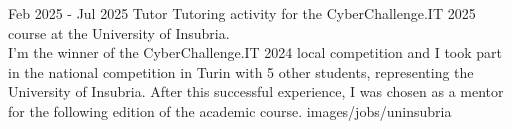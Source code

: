 {Feb 2025 - Jul 2025}
{Tutor}
{Tutoring activity for the CyberChallenge.IT 2025 course at the University of Insubria.\\
I'm the winner of the CyberChallenge.IT 2024 local competition and 
I took part in the national competition in Turin with 5 other students,
representing the University of Insubria.
After this successful experience,
I was chosen as a mentor for the following edition of the academic course.}
{images/jobs/uninsubria}
